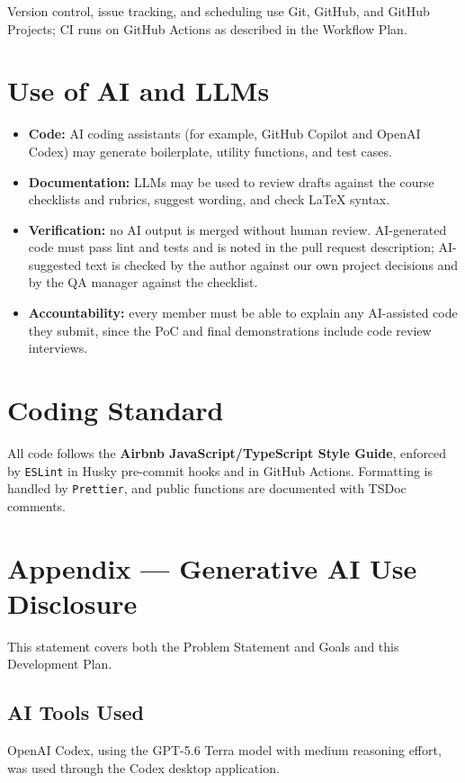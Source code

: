 \documentclass{article}
\begin{document}
Version control, issue tracking, and scheduling use Git, GitHub, and GitHub
Projects; CI runs on GitHub Actions as described in the Workflow Plan.

\section{Use of AI and LLMs}

\begin{itemize}
    \item \textbf{Code:} AI coding assistants (for example, GitHub Copilot and
    OpenAI Codex) may generate boilerplate, utility functions, and test cases.
    \item \textbf{Documentation:} LLMs may be used to review drafts against the
    course checklists and rubrics, suggest wording, and check \LaTeX{} syntax.
    \item \textbf{Verification:} no AI output is merged without human review.
    AI-generated code must pass lint and tests and is noted in the pull request
    description; AI-suggested text is checked by the author against our own
    project decisions and by the QA manager against the checklist.
    \item \textbf{Accountability:} every member must be able to explain any
    AI-assisted code they submit, since the PoC and final demonstrations
    include code review interviews.
\end{itemize}

\section{Coding Standard}

All code follows the \textbf{Airbnb JavaScript/TypeScript Style Guide},
enforced by \texttt{ESLint} in Husky pre-commit hooks and in GitHub Actions.
Formatting is handled by \texttt{Prettier}, and public functions are documented
with TSDoc comments.

\newpage{}
\section{Appendix --- Generative AI Use Disclosure}

This statement covers both the Problem Statement and Goals and this Development
Plan.

\subsection{AI Tools Used}
OpenAI Codex, using the GPT-5.6 Terra model with medium reasoning effort, was
used through the Codex desktop application.
\end{document}
